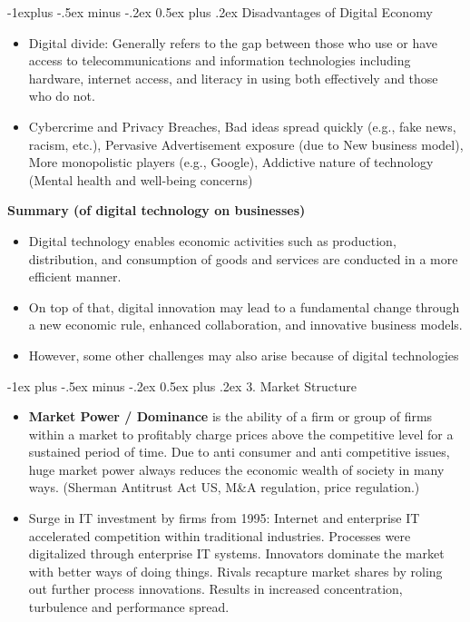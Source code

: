 \documentclass[12pt, landscape]{article}
\makeatletter
\renewcommand{\section}{\@startsection{section}{1}{0mm}%
                                {-1ex plus -.5ex minus -.2ex}%
                                {0.5ex plus .2ex}%
                                {\normalfont\large\bfseries}}
\renewcommand{\subsection}{\@startsection{subsection}{2}{0mm}%
                                {-1explus -.5ex minus -.2ex}%
                                {0.5ex plus .2ex}%
                                {\normalfont\normalsize\bfseries}}
\makeatother
\begin{document}
\begin{multicols*}{3}
\subsection{Disadvantages of Digital Economy}
\begin{itemize}
\item Digital divide: Generally refers to the gap between those who use or have access to telecommunications and information technologies including hardware, internet access, and literacy in using both effectively and those who do not.
\item Cybercrime and Privacy Breaches, Bad ideas spread quickly (e.g., fake news, racism, etc.), Pervasive Advertisement exposure (due to New business model), More monopolistic players (e.g., Google), Addictive nature of technology (Mental health and well-being concerns)
\end{itemize}

\textbf{Summary (of digital technology on businesses)}
\begin{itemize}
\item Digital technology enables economic activities such as production, distribution, and consumption of goods and services are conducted in a more efficient manner.
\item On top of that, digital innovation may lead to a fundamental change through a new economic rule, enhanced collaboration, and innovative business models.
\item However, some other challenges may also arise because of digital technologies
\end{itemize}

\vfill\null
\columnbreak

\section{3. Market Structure}
\begin{itemize}
\item \textbf{Market Power / Dominance} is the ability of a firm or group of firms within a market to profitably charge prices above the competitive level for a sustained period of time. Due to anti consumer and anti competitive issues, huge market power always reduces the economic wealth of society in many ways. (Sherman Antitrust Act US, M\&A regulation, price regulation.)
\item Surge in IT investment by firms from 1995: Internet and enterprise IT accelerated competition within traditional industries. Processes were digitalized through enterprise IT systems. Innovators dominate the market with better ways of doing things. Rivals recapture market shares by roling out further process innovations. Results in increased concentration, turbulence and performance spread.

\end{itemize}
\end{multicols*}
\end{document}
